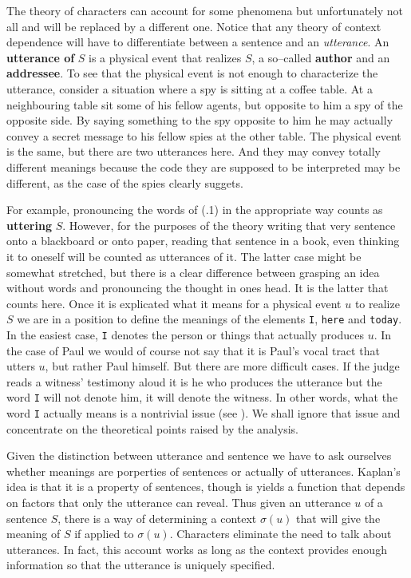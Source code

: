 The theory of characters can account for some phenomena but unfortunately 
not all and will be replaced by a different one. Notice that any theory 
of context dependence will have to differentiate between a sentence and 
an {\it utterance}.
An {\bf utterance of} $S$ is a physical event that realizes $S$, 
a so--called {\bf author} and an {\bf addressee}. To see that the 
physical event is not enough to characterize the utterance, consider 
a situation where a spy is sitting at a coffee table. At a neighbouring 
table sit some of his fellow agents, but opposite to him a spy of 
the opposite side. By saying something to the spy opposite to him 
he may actually convey a secret message to his fellow spies at the 
other table. The physical event is the same, but there are two utterances 
here. And they may convey totally different meanings because the 
code they are supposed to be interpreted may be different, as the 
case of the spies clearly suggets. 

For example, pronouncing the words of (\thesection.1) in the 
appropriate way counts as {\bf uttering} $S$. However, for the 
purposes of the theory writing that very sentence onto a blackboard 
or onto paper, reading that sentence in a book, even thinking it to 
oneself will be counted as utterances of it. The latter case might 
be somewhat stretched, but there is a clear difference between 
grasping an idea without words and pronouncing the thought in ones 
head. It is the latter that counts here. Once it is explicated what 
it means for a physical event $u$ to realize $S$ we are in a position 
to define the meanings of the elements {\tt I}, {\tt here} and 
{\tt today}. In the easiest case, {\tt I} denotes the person or 
things that actually produces $u$. In the case of Paul we would of 
course not say that it is Paul's vocal tract that utters $u$, 
but rather Paul himself. But there are more difficult cases. If 
the judge reads a witness' testimony aloud it is he who produces 
the utterance but the word {\tt I} will not denote him, it will 
denote the witness. In other words, what the word {\tt I} actually 
means is a nontrivial issue (see \cite{mccawley:person}). We 
shall ignore that issue and concentrate on the theoretical points 
raised by the analysis. 

Given the distinction between utterance and sentence we have to ask 
ourselves whether meanings are porperties of sentences or actually 
of utterances. Kaplan's idea is that it is a property of sentences, 
though is yields a function that depends on factors that only the 
utterance can reveal. Thus given an utterance $u$ of a sentence $S$, 
there is a way of determining a context $\sigma(u)$ that will give 
the meaning of $S$ if applied to $\sigma(u)$. Characters eliminate 
the need to talk about utterances. In fact, this account works as 
long as the context provides enough information so that the utterance 
is uniquely specified.

